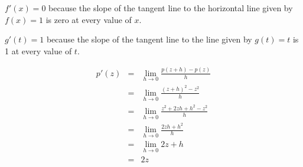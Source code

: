 \begin{activitySolution}
\ba
	\item  $f'(x) = 0$ because the slope of the tangent line to the horizontal line given by $f(x) = 1$ is zero at every value of $x$.
	\item  $g'(t) = 1$ because the slope of the tangent line to the line given by $g(t) = t$ is 1 at every value of $t$.
	\item  \begin{eqnarray*}
		p'(z) & = & \lim_{h \to 0} \frac{p(z+h) - p(z)}{h} \\
		       & = & \lim_{h \to 0} \frac{(z+h)^2 - z^2}{h} \\
		       & = & \lim_{h \to 0} \frac{z^2 + 2zh + h^2 - z^2}{h} \\
		       & = & \lim_{h \to 0} \frac{2zh + h^2}{h} \\
		       & = & \lim_{h \to 0} 2z + h \\
		       & = & 2z
		 \end{eqnarray*}
		 

\end{activitySolution}
